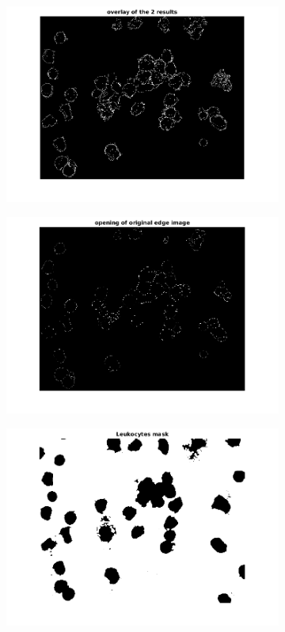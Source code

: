 \begin{figure}[htbp]
\begin{subfigure}[b]{0.45\textwidth}
        \includegraphics[width=\textwidth]{img/final/figure5.png}
        \caption{ }
        \label{fig:fig5}
    \end{subfigure}
    \begin{subfigure}[b]{0.45\textwidth}
        \includegraphics[width=\textwidth]{img/final/figure6.png}
        \caption{ }
        \label{fig:fig6}
    \end{subfigure}
    \begin{subfigure}[b]{0.45\textwidth}
        \includegraphics[width=\textwidth]{img/final/figure7.png}

\end{subfigure}
\end{figure}
